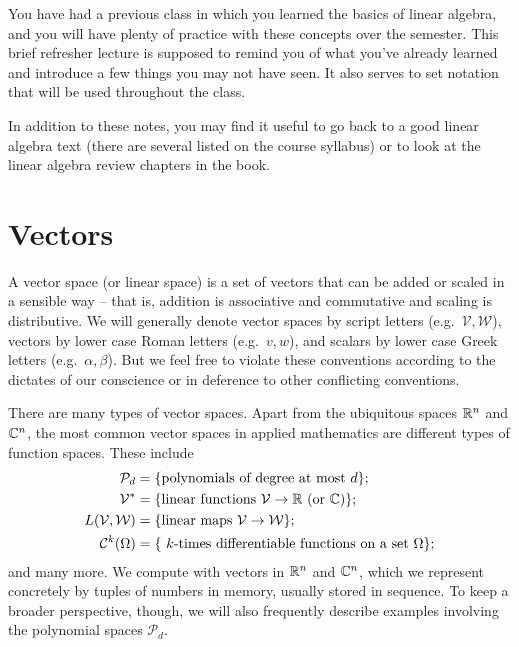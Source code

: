 \documentclass[12pt, leqno]{article} %
\begin{document}

You have had a previous class in which you learned the basics of
linear algebra, and you will have plenty of practice with these
concepts over the semester.  This brief refresher lecture is supposed
to remind you of what you've already learned and introduce a few
things you may not have seen.  It also serves to set notation that
will be used throughout the class.

In addition to these notes, you may find it useful to go back to a
good linear algebra text (there are several listed on the course
syllabus) or to look at the linear algebra review chapters in the
book.

\section{Vectors}

A vector space (or linear space) is a set of vectors that can be added
or scaled in a sensible way -- that is, addition is associative and
commutative and scaling is distributive.  We will generally denote
vector spaces by script letters (e.g.~$\mathcal{V}, \mathcal{W}$),
vectors by lower case Roman letters (e.g.~$v, w$), and scalars by
lower case Greek letters (e.g.~$\alpha, \beta$).  But we feel free to
violate these conventions according to the dictates of our conscience
or in deference to other conflicting conventions.

There are many types of vector spaces.  Apart from the ubiquitous
spaces $\mathbb{R}^n$ and $\mathbb{C}^n$, the most common vector spaces in applied
mathematics are different types of function spaces.  These include
\begin{align*}
  \mathcal{P}_d &=
  \{ \mbox{polynomials of degree at most $d$} \}; \\
  \mathcal{V}^* &=
  \{ \mbox{linear functions $\mathcal{V} \rightarrow \mathbb{R}$ (or $\mathbb{C}$)} \}; \\
  L(\mathcal{V}, \mathcal{W}) &=
  \{ \mbox{linear maps $\mathcal{V} \rightarrow \mathcal{W}$} \}; \\
  \mathcal{C}^k(\Omega) &=
  \{\mbox{ $k$-times differentiable functions on a set $\Omega$} \};
\end{align*}
and many more.  We compute with vectors in $\mathbb{R}^n$ and $\mathbb{C}^n$,
which we represent concretely by tuples of numbers in memory, usually
stored in sequence.  To keep a broader perspective, though, we will
also frequently describe examples involving the polynomial spaces
$\mathcal{P}_d$.
\end{document}

